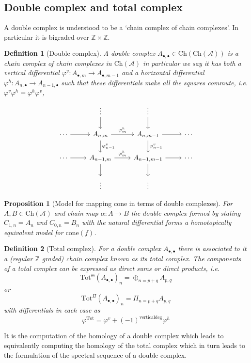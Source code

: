 \documentclass[12pt]{article}
\numberwithin{equation}{section}
\newcommand{\Z}{\mathbb{Z}}
\newtheorem{definition}{Definition}[section]
\newtheorem{proposition}{Proposition}[section]
\begin{document}
	\subsection{Double complex and total complex}
	A double complex is understood to be a `chain complex of chain complexes'. In particular it is bigraded over $\Z \times \Z$.
	\begin{definition}[Double complex]
		A double complex $A_{\bullet, \bullet}\in \mathrm{Ch}(\mathrm{Ch}(\mathcal{A}))$ is a chain complex of chain complexes in $\mathrm{Ch}(\mathcal{A})$ in particular we say it has both a vertical differential $\varphi^v: A_{\bullet, m}\to A_{\bullet, m-1} $ and a horizontal differential $\varphi^h: A_{n, \bullet} \to A_{n-1, \bullet}$  such that these differentials make all the squares commute, i.e. $\varphi^v \varphi^h=\varphi^h \varphi^v$,
		\[\begin{tikzcd}
			& \vdots & \vdots \\
			\cdots & {A_{n,m}} & {A_{n,m-1}} & \cdots \\
			\cdots & {A_{n-1,m}} & {A_{n-1,m-1}} & \cdots \\
			& \vdots & \vdots
			\arrow["{\varphi^h_{m}}", from=2-2, to=2-3]
			\arrow[from=2-3, to=2-4]
			\arrow[from=2-1, to=2-2]
			\arrow[from=1-2, to=2-2]
			\arrow[from=1-3, to=2-3]
			\arrow["{\varphi^v_{n-1}}", from=2-2, to=3-2]
			\arrow["{\varphi^v_{n-1}}", from=2-3, to=3-3]
			\arrow[from=3-2, to=4-2]
			\arrow[from=3-3, to=4-3]
			\arrow[from=3-1, to=3-2]
			\arrow["{\varphi^h_{m}}", from=3-2, to=3-3]
			\arrow[from=3-3, to=3-4]
		\end{tikzcd}\]
	\end{definition}
	\begin{proposition}[Model for mapping cone in terms of double complexes]
		For $A,B \in \mathrm{Ch}(\mathcal{A})$ and chain map $\alpha: A \to B$ the double complex formed by stating $C_{1,n}=A_n$ and $C_{0,n}=B_n$ with the natural differential forms a homotopically equivalent model for $\mathrm{cone}(f)$.
	\end{proposition}
	\begin{definition}[Total complex]
		For a double complex $A_{\bullet,\bullet}$ there is associated to it a (regular $\Z$ graded) chain complex known as its total complex. The components of a total complex can be expressed as direct sums or direct products, i.e.
		\[ \mathrm{Tot}^\oplus (A_{\bullet, \bullet})_n=\oplus_{n=p+q} A_{p,q} \]
		or
		\[ \mathrm{Tot}^\Pi (A_{\bullet, \bullet})_n=\Pi_{n=p+q} A_{p,q} \]
		with differentials in each case as 
		\[ \varphi^{\mathrm{Tot}}=\varphi^v+(-1)^{\mathrm{vertical deg}}\varphi^h \]
	\end{definition}
	It is the computation of the homology of a double complex which leads to equivalently computing the homology of the total complex which in turn leads to the formulation of the spectral sequence of a double complex.
\end{document}
